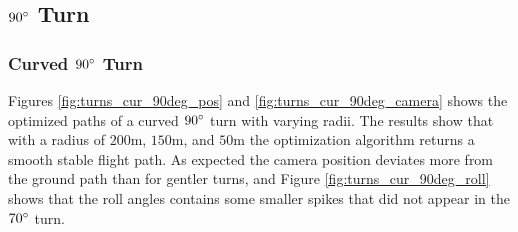\subsection{$90\degree$ Turn}

\subsubsection{Curved $90\degree$ Turn}

Figures \ref{fig:turns_cur_90deg_pos} and \ref{fig:turns_cur_90deg_camera} shows the optimized paths of a curved $90\degree$ turn with varying radii. The results show that with a radius of $200$m, $150$m, and $50$m the optimization algorithm returns a smooth stable flight path. As expected the camera position deviates more from the ground path than for gentler turns, and Figure \ref{fig:turns_cur_90deg_roll} shows that the roll angles contains some smaller spikes that did not appear in the $70\degree$ turn.



